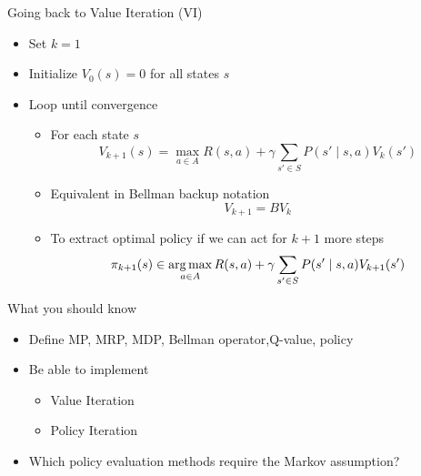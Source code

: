 \begin{frame}[c]{Going back to Value Iteration (VI)}

\begin{itemize}
	\item  Set $k = 1$
	\item Initialize $V_0(s) = 0$ for all states $s$
	\item Loop until convergence
	\begin{itemize}
		\item For each state $s$
		$$V_{k+1}(s) = \max_{a\in A } R(s,a) + \gamma \sum_{s' \in S } P(s' \mid s,a) V_k(s') $$
		\item Equivalent in Bellman backup notation
				$$ V_{k+1} = BV_k$$
		\item To extract optimal policy if we can act for $k+1$ more steps
		$$\pi_{k+1}(s) \in \operatorname*{arg\,max}_{a \in A} R(s,a) + \gamma \sum_{s' \in S} P(s' \mid s,a) V_{k+1}(s') $$
	\end{itemize}
	
\end{itemize}

\end{frame}
%
%
\begin{frame}[c]{What you should know}

\begin{itemize}
	\item  Define MP, MRP, MDP, Bellman operator,Q-value, policy
	\item Be able to implement
	\begin{itemize}
		\item Value Iteration
		\item Policy Iteration
	\end{itemize}
	\item Which policy evaluation methods require the Markov assumption?
\end{itemize}

\end{frame}



